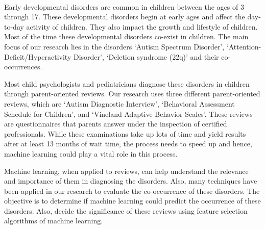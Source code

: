 \begin{center}
\\[12pt]
\end{center}
\vspace*{2cm}
\linespread{2}
Early developmental disorders are common in children between the ages of 3 through 17. These developmental disorders begin at early ages and affect the day-to-day activity of children. They also impact the growth and lifestyle of children. Most of the time these developmental disorders co-exist in children. The main focus of our research lies in the disorders `Autism Spectrum Disorder', `Attention-Deficit/Hyperactivity Disorder', `Deletion syndrome (22q)' and their co-occurrences.

Most child psychologists and pediatricians diagnose these disorders in children through parent-oriented reviews. Our research uses three different parent-oriented reviews, which are `Autism Diagnostic Interview', `Behavioral Assessment Schedule for Children', and `Vineland Adaptive Behavior Scales'. These reviews are questionnaires that parents answer under the inspection of certified professionals. While these examinations take up lots of time and yield results after at least 13 months of wait time, the process needs to speed up and hence, machine learning could play a vital role in this process.

Machine learning, when applied to reviews, can help understand the relevance and importance of them in diagnosing the disorders. Also, many techniques have been applied in our research to evaluate the co-occurrence of these disorders. The objective is to determine if machine learning could predict the occurrence of these disorders. Also, decide the significance of these reviews using feature selection algorithms of machine learning.
\setcounter{page}{1}
\thispagestyle{empty}
\pagestyle{empty}
\cleardoublepage
